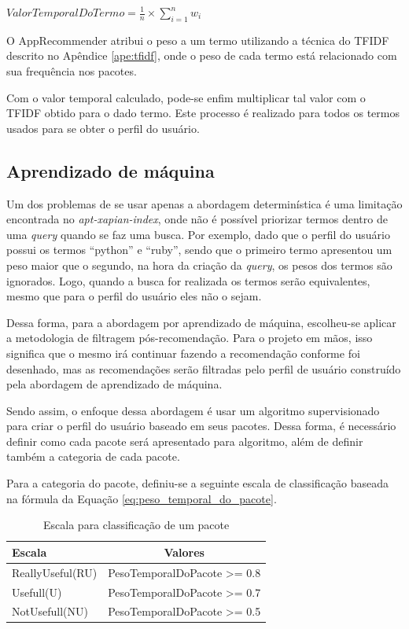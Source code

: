 $ValorTemporalDoTermo = \frac{1}{n} \times \sum\limits_{i=1}^{n} w_i$

O AppRecommender atribui o peso a um termo utilizando a técnica do TFIDF
descrito no Apêndice \ref{ape:tfidf}, onde o peso de cada termo está relacionado
com sua frequência nos pacotes.

Com o valor temporal calculado, pode-se enfim multiplicar tal valor com o TFIDF
obtido para o dado termo. Este processo é realizado para todos os termos usados
para se obter o perfil do usuário.

\subsection{Aprendizado de máquina}

Um dos problemas de se usar apenas a abordagem determinística é uma limitação
encontrada no \textit{apt-xapian-index}, onde não é possível priorizar termos
dentro de uma \textit{query} quando se faz uma busca. Por exemplo, dado que o perfil
do usuário possui os termos ``python'' e ``ruby'', sendo que o primeiro termo
apresentou um peso maior que o segundo, na hora da criação da \textit{query}, os pesos
dos termos são ignorados. Logo, quando a busca for realizada os termos serão
equivalentes, mesmo que para o perfil do usuário eles não o sejam.

Dessa forma, para a abordagem por aprendizado de máquina, escolheu-se aplicar a
metodologia de filtragem pós-recomendação. Para o projeto em mãos, isso
significa que o mesmo irá continuar fazendo a recomendação conforme foi
desenhado, mas as recomendações serão filtradas pelo perfil de usuário
construído pela abordagem de aprendizado de máquina.

Sendo assim, o enfoque dessa abordagem é usar um algoritmo supervisionado
para criar o perfil do usuário baseado em seus pacotes. Dessa forma, é
necessário definir como cada pacote será apresentado para algoritmo, além de
definir também a categoria de cada pacote.

Para a categoria do pacote, definiu-se a seguinte escala de classificação
baseada na fórmula da Equação \ref{eq:peso_temporal_do_pacote}.

\begin{table}[h]
\centering
\caption{Escala para classificação de um pacote}
\begin{tabular}{lc}
\hline
\rowcolor[HTML]{EFEFEF}
{Escala} & {Valores} \\ \hline
{ReallyUseful(RU)}  & PesoTemporalDoPacote >= 0.8                  \\ \hline
{Usefull(U)}   & PesoTemporalDoPacote >= 0.7                       \\ \hline
{NotUsefull(NU)}   & PesoTemporalDoPacote >= 0.5                   \\ \hline
\end{tabular}
\label{tab:classificacao_pacotes}
\end{table}


